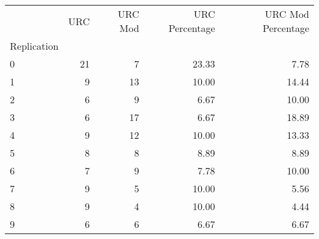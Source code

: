 \begin{tabular}{lrrrr}
\toprule
 & URC & URC Mod & URC Percentage & URC Mod Percentage \\
Replication &  &  &  &  \\
\midrule
0 & 21 & 7 & 23.33 & 7.78 \\
1 & 9 & 13 & 10.00 & 14.44 \\
2 & 6 & 9 & 6.67 & 10.00 \\
3 & 6 & 17 & 6.67 & 18.89 \\
4 & 9 & 12 & 10.00 & 13.33 \\
5 & 8 & 8 & 8.89 & 8.89 \\
6 & 7 & 9 & 7.78 & 10.00 \\
7 & 9 & 5 & 10.00 & 5.56 \\
8 & 9 & 4 & 10.00 & 4.44 \\
9 & 6 & 6 & 6.67 & 6.67 \\
\bottomrule
\end{tabular}
